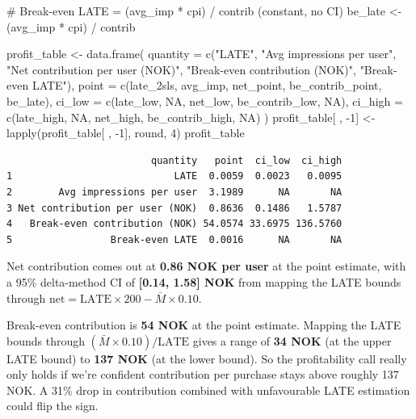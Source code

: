 \documentclass[
  letterpaper,
  DIV=11,
  numbers=noendperiod]{scrartcl}
\newenvironment{Shaded}{\begin{snugshade}}{\end{snugshade}}
\newcommand{\AttributeTok}[1]{\textcolor[rgb]{0.40,0.45,0.13}{#1}}
\newcommand{\CommentTok}[1]{\textcolor[rgb]{0.37,0.37,0.37}{#1}}
\newcommand{\ConstantTok}[1]{\textcolor[rgb]{0.56,0.35,0.01}{#1}}
\newcommand{\DecValTok}[1]{\textcolor[rgb]{0.68,0.00,0.00}{#1}}
\newcommand{\FunctionTok}[1]{\textcolor[rgb]{0.28,0.35,0.67}{#1}}
\newcommand{\NormalTok}[1]{\textcolor[rgb]{0.00,0.23,0.31}{#1}}
\newcommand{\OtherTok}[1]{\textcolor[rgb]{0.00,0.23,0.31}{#1}}
\newcommand{\SpecialCharTok}[1]{\textcolor[rgb]{0.37,0.37,0.37}{#1}}
\newcommand{\StringTok}[1]{\textcolor[rgb]{0.13,0.47,0.30}{#1}}
\begin{document}
\begin{Shaded}
\begin{Highlighting}[]
\CommentTok{\# Break{-}even LATE = (avg\_imp * cpi) / contrib  (constant, no CI)}
\NormalTok{be\_late }\OtherTok{\textless{}{-}}\NormalTok{ (avg\_imp }\SpecialCharTok{*}\NormalTok{ cpi) }\SpecialCharTok{/}\NormalTok{ contrib}

\NormalTok{profit\_table }\OtherTok{\textless{}{-}} \FunctionTok{data.frame}\NormalTok{(}
  \AttributeTok{quantity =} \FunctionTok{c}\NormalTok{(}\StringTok{"LATE"}\NormalTok{,}
               \StringTok{"Avg impressions per user"}\NormalTok{,}
               \StringTok{"Net contribution per user (NOK)"}\NormalTok{,}
               \StringTok{"Break{-}even contribution (NOK)"}\NormalTok{,}
               \StringTok{"Break{-}even LATE"}\NormalTok{),}
  \AttributeTok{point    =} \FunctionTok{c}\NormalTok{(late\_2sls, avg\_imp, net\_point, be\_contrib\_point, be\_late),}
  \AttributeTok{ci\_low   =} \FunctionTok{c}\NormalTok{(late\_low,  }\ConstantTok{NA}\NormalTok{,      net\_low,   be\_contrib\_low,   }\ConstantTok{NA}\NormalTok{),}
  \AttributeTok{ci\_high  =} \FunctionTok{c}\NormalTok{(late\_high, }\ConstantTok{NA}\NormalTok{,      net\_high,  be\_contrib\_high,  }\ConstantTok{NA}\NormalTok{)}
\NormalTok{)}
\NormalTok{profit\_table[ , }\SpecialCharTok{{-}}\DecValTok{1}\NormalTok{] }\OtherTok{\textless{}{-}} \FunctionTok{lapply}\NormalTok{(profit\_table[ , }\SpecialCharTok{{-}}\DecValTok{1}\NormalTok{], round, }\DecValTok{4}\NormalTok{)}
\NormalTok{profit\_table}
\end{Highlighting}
\end{Shaded}

\begin{verbatim}
                         quantity   point  ci_low  ci_high
1                            LATE  0.0059  0.0023   0.0095
2        Avg impressions per user  3.1989      NA       NA
3 Net contribution per user (NOK)  0.8636  0.1486   1.5787
4   Break-even contribution (NOK) 54.0574 33.6975 136.5760
5                 Break-even LATE  0.0016      NA       NA
\end{verbatim}

Net contribution comes out at \textbf{0.86 NOK per user} at the point
estimate, with a 95\% delta-method CI of \textbf{{[}0.14, 1.58{]} NOK}
from mapping the LATE bounds through
\(\text{net} = \text{LATE} \times 200 - \bar M \times 0.10\).

Break-even contribution is \textbf{54 NOK} at the point estimate.
Mapping the LATE bounds through \((\bar M \times 0.10)/\text{LATE}\)
gives a range of \textbf{34 NOK} (at the upper LATE bound) to
\textbf{137 NOK} (at the lower bound). So the profitability call really
only holds if we're confident contribution per purchase stays above
roughly 137 NOK. A 31\% drop in contribution combined with unfavourable
LATE estimation could flip the sign.
\end{document}
